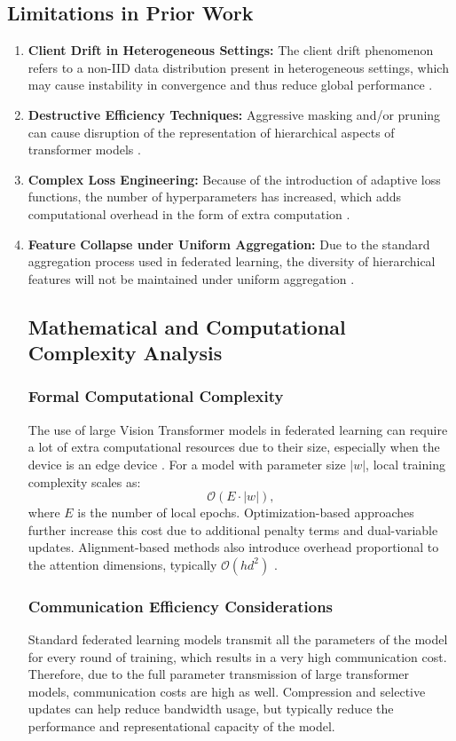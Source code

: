 \documentclass{ieeeaccess}
\begin{document}
\subsection{Limitations in Prior Work}
\begin{enumerate}
\item \textbf{Client Drift in Heterogeneous Settings:} The client drift phenomenon refers to a non-IID data distribution present in heterogeneous settings, which may cause instability in convergence and thus reduce global performance \cite{Zhu2025}.
\item \textbf{Destructive Efficiency Techniques:} Aggressive masking and/or pruning can cause disruption of the representation of hierarchical aspects of transformer models \cite{Wu2024}.

\item \textbf{Complex Loss Engineering:} Because of the introduction of adaptive loss functions, the number of hyperparameters has increased, which adds computational overhead in the form of extra computation \cite{Zhao2025}.

\item \textbf{Feature Collapse under Uniform Aggregation:} Due to the standard aggregation process used in federated learning, the diversity of hierarchical features will not be maintained under uniform aggregation \cite{Darzi2024}.

\subsection{Mathematical and Computational Complexity Analysis}
\subsubsection{Formal Computational Complexity}
The use of large Vision Transformer models in federated learning can require a lot of extra computational resources due to their size, especially when the device is an edge device \cite{Wu2024}. For a model with parameter size $|w|$, local training complexity scales as:
\begin{equation}
\mathcal{O}(E \cdot |w|),
\end{equation}
where $E$ is the number of local epochs. Optimization-based approaches further increase this cost due to additional penalty terms and dual-variable updates. Alignment-based methods also introduce overhead proportional to the attention dimensions, typically $\mathcal{O}(h d^2)$ \cite{Darzi2024}.
\subsubsection{Communication Efficiency Considerations}
Standard federated learning models transmit all the parameters of the model for every round of training, which results in a very high communication cost. Therefore, due to the full parameter transmission of large transformer models, communication costs are high as well. Compression and selective updates can help reduce bandwidth usage, but typically reduce the performance and representational capacity of the model.

\end{enumerate}
\end{document}
